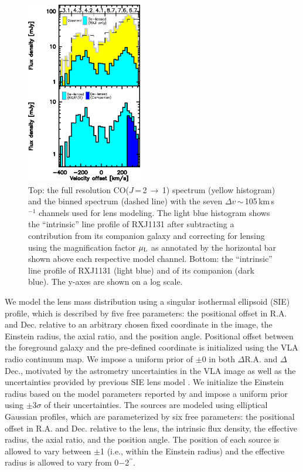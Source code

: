 \documentclass[]{emulateapj}
\newcommand{\rarr}{$\rightarrow$}
\newcommand{\bco}{\mbox{CO($J$\,=\,2\,\rarr\,1)}\xspace}
\newcommand{\kms}{\mbox{km\,s$^{-1}$}\xspace}
\begin{document}
\begin{figure}[!htbp]
\includegraphics[width=0.45\textwidth]{f5.eps}
\caption{Top: the full resolution \bco spectrum (yellow histogram) and
the binned spectrum (dashed line) with the seven $\Delta v$\,$\sim$\,105\,\kms channels used for lens modeling. The
light blue histogram shows the ``intrinsic'' line profile of RXJ1131
after subtracting a contribution from its companion galaxy and
correcting for lensing using the magnification factor $\mu_{\rm L}$ as annotated by the horizontal bar shown
above each respective model channel.
Bottom: the ``intrinsic'' line profile of RXJ1131 (light blue) and of its companion (dark blue).
The y-axes are shown on a log scale.
\label{fig:delensed}}
\end{figure}

We model the lens mass distribution using a singular isothermal
ellipsoid (SIE) profile, which is described by five free parameters: the
positional offset in R.A. and Dec. relative to an arbitrary chosen
fixed coordinate in the image, the Einstein radius, the axial ratio, and the
position angle.
Positional offset between the foreground galaxy and the pre-defined coordinate is initialized
using the VLA radio continuum map.
We impose a
uniform prior of $\pm$0 in both $\Delta$R.A. and $\Delta$Dec.,
motivated by the astrometry uncertainties in the VLA image as well as
the uncertainties provided by previous SIE lens model .
We initialize the Einstein radius based on the model parameters reported by 
and impose a uniform prior using $\pm$3$\sigma$ of their uncertainties.
The sources are modeled using elliptical Gaussian profiles, which are
parameterized by six free parameters: the positional offset in R.A.
and Dec. relative to the lens, the intrinsic flux density, the effective
radius, the axial ratio, and the position angle. The position of each source
is allowed to vary between $\pm$1 (i.e., within the Einstein radius)
and the effective radius is allowed to vary from 0$-$2$^{\prime\prime}$.
\end{document}
